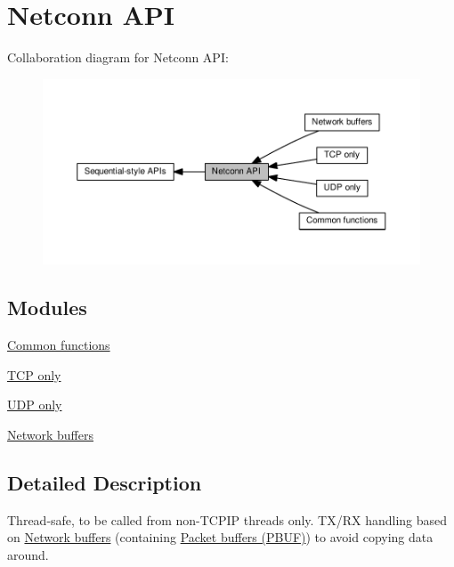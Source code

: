 \hypertarget{group__netconn}{}\section{Netconn A\+PI}
\label{group__netconn}
Collaboration diagram for Netconn A\+PI\+:
\nopagebreak
\begin{figure}[H]
\begin{center}
\leavevmode
\includegraphics[width=350pt]{group__netconn}
\end{center}
\end{figure}
\subsection*{Modules}
\begin{DoxyCompactItemize}
\item 
\hyperlink{group__netconn__common}{Common functions}
\item 
\hyperlink{group__netconn__tcp}{T\+C\+P only}
\item 
\hyperlink{group__netconn__udp}{U\+D\+P only}
\item 
\hyperlink{group__netbuf}{Network buffers}
\end{DoxyCompactItemize}


\subsection{Detailed Description}
Thread-\/safe, to be called from non-\/\+T\+C\+P\+IP threads only. T\+X/\+RX handling based on \hyperlink{group__netbuf}{Network buffers} (containing \hyperlink{group__pbuf}{Packet buffers (P\+B\+UF)}) to avoid copying data around. 